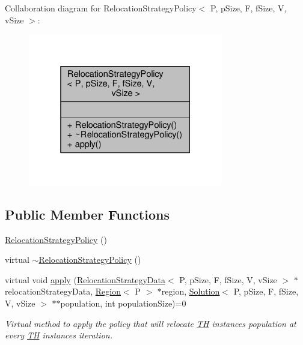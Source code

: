 Collaboration diagram for Relocation\+Strategy\+Policy$<$ P, p\+Size, F, f\+Size, V, v\+Size $>$\+:
\nopagebreak
\begin{figure}[H]
\begin{center}
\leavevmode
\includegraphics[width=241pt]{classRelocationStrategyPolicy__coll__graph}
\end{center}
\end{figure}
\subsection*{Public Member Functions}
\begin{DoxyCompactItemize}
\item 
\hyperlink{classRelocationStrategyPolicy_ae5c37f688b1e178d325a5d1901c6b121}{Relocation\+Strategy\+Policy} ()
\item 
virtual \hyperlink{classRelocationStrategyPolicy_ab8c3b00d15e2ab2dd01e52b1a201a068}{$\sim$\+Relocation\+Strategy\+Policy} ()
\item 
virtual void \hyperlink{classRelocationStrategyPolicy_ab1de627ca81a24739d942806cfed27e0}{apply} (\hyperlink{structRelocationStrategyData}{Relocation\+Strategy\+Data}$<$ P, p\+Size, F, f\+Size, V, v\+Size $>$ $\ast$relocation\+Strategy\+Data, \hyperlink{classRegion}{Region}$<$ P $>$ $\ast$region, \hyperlink{classSolution}{Solution}$<$ P, p\+Size, F, f\+Size, V, v\+Size $>$ $\ast$$\ast$population, int population\+Size)=0
\begin{DoxyCompactList}\small\item\em Virtual method to apply the policy that will relocate \hyperlink{classTH}{TH} instance\textquotesingle{}s population at every \hyperlink{classTH}{TH} instance\textquotesingle{}s iteration. \end{DoxyCompactList}\end{DoxyCompactItemize}


